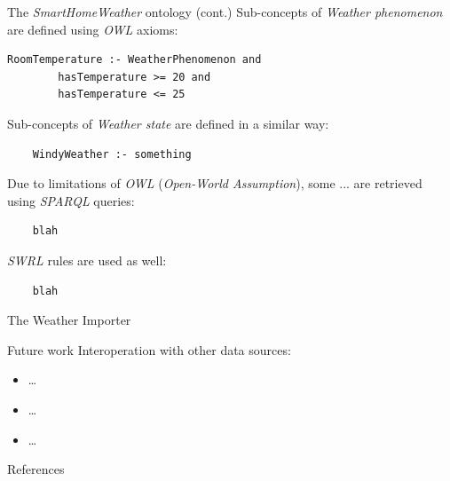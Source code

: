 \documentclass[final,hyperref={pdfpagelabels=true}]{beamer}
\newenvironment{postit}
{\begin{beamercolorbox}[sep=1em,wd=7cm]{postit}}
{\end{beamercolorbox}}
\begin{document}
\begin{frame}[fragile]
\begin{columns}[t]
\begin{column}{.45\textwidth}
\begin{block}{The \emph{SmartHomeWeather} ontology (cont.)}
	Sub-concepts of \emph{Weather phenomenon} are defined using \emph{OWL} axioms:

	\begin{lstlisting}
RoomTemperature :- WeatherPhenomenon and
        hasTemperature >= 20 and
        hasTemperature <= 25
	\end{lstlisting}

	Sub-concepts of \emph{Weather state} are defined in a similar way:

	\begin{lstlisting}
	WindyWeather :- something
	\end{lstlisting}

	Due to limitations of \emph{OWL} (\emph{Open-World Assumption}), some ... are retrieved using \emph{SPARQL} queries: %

	\begin{lstlisting}
	blah
	\end{lstlisting}

	\emph{SWRL} rules are used as well:

	\begin{lstlisting}
	blah
        \end{lstlisting}
      \end{block}

      \begin{block}{The Weather Importer}
      \end{block}

      \begin{block}{Future work}
	Interoperation with other data sources:
	\begin{itemize}
	  \item … %
	  \item … %
	  \item … %
	\end{itemize}
      \end{block}

      \begin{block}{References}
	
	

      \end{block}
    \end{column}
  \end{columns}

  
\end{frame}
\end{document}
